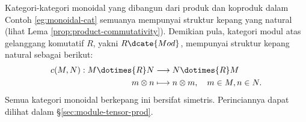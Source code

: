\begin{example}
	Kategori-kategori monoidal yang dibangun dari produk dan koproduk dalam Contoh \ref{eg:monoidal-cat} semuanya mempunyai struktur kepang yang natural (lihat Lema \ref{prop:product-commutativity}). Demikian pula, kategori modul atas gelanggang komutatif $R$, yakni $R\dcate{Mod}$, mempunyai struktur kepang natural sebagai berikut:
	\begin{align*}
		c(M, N): M \dotimes{R} N & \longrightarrow N \dotimes{R} M \\
		m \otimes n & \longmapsto n \otimes m, \quad m \in M, n \in N.
	\end{align*}
	Semua kategori monoidal berkepang ini bersifat simetris. Perinciannya dapat dilihat dalam \S\ref{sec:module-tensor-prod}.
\end{example}


